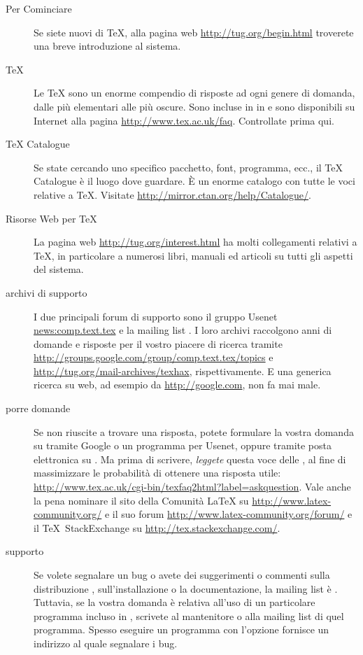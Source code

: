 \documentclass{article}
\begin{document}
\begin{description}
\item [Per Cominciare] Se siete nuovi di \TeX, alla pagina web
  \url{http://tug.org/begin.html} troverete una breve introduzione al sistema.

\item [\TeX{} ] Le \TeX{}  sono un enorme compendio di
  risposte ad ogni genere di domanda, dalle più elementari alle più
  oscure. Sono incluse in \TL{} in
   e sono disponibili
  su Internet alla pagina \url{http://www.tex.ac.uk/faq}. Controllate
  prima qui.

\item [\TeX{} Catalogue] Se state cercando uno specifico pacchetto, font,
  programma, ecc., il \TeX{} Catalogue è il luogo dove guardare. È un
  enorme catalogo con tutte le voci relative a \TeX. Visitate
  \url{http://mirror.ctan.org/help/Catalogue/}.


\item [Risorse Web per \TeX{}] La pagina web
  \url{http://tug.org/interest.html} ha molti collegamenti relativi a
  \TeX, in particolare a numerosi libri, manuali ed articoli su tutti
  gli aspetti del sistema.

\item [archivi di supporto] I due principali forum di supporto sono il
  gruppo Usenet \url{news:comp.text.tex} e la mailing list
  . I loro archivi raccolgono anni di domande e
  risposte per il vostro piacere di ricerca tramite
  \url{http://groups.google.com/group/comp.text.tex/topics} e
  \url{http://tug.org/mail-archives/texhax}, rispettivamente. E una
  generica ricerca su web, ad esempio da \url{http://google.com}, non fa
  mai male.

\item [porre domande] Se non riuscite a trovare una risposta, potete
  formulare la vostra domanda su  tramite Google o
  un programma per Usenet, oppure tramite posta elettronica su
  . Ma prima di scrivere, \emph{leggete} questa voce
  delle , al fine di massimizzare le probabilità di ottenere una
  risposta utile:
  \url{http://www.tex.ac.uk/cgi-bin/texfaq2html?label=askquestion}.
  Vale anche la pena nominare il sito della Comunità \LaTeX{} su
  \url{http://www.latex-community.org/} e il suo forum
  \url{http://www.latex-community.org/forum/} e il \TeX\ StackExchange su
  \url{http://tex.stackexchange.com/}.

\item [supporto \TL{}] Se volete segnalare un bug o avete dei suggerimenti o
  commenti sulla distribuzione \TL{}, sull'installazione o la
  documentazione, la mailing list è . Tuttavia, se
  la vostra domanda è relativa all'uso di un particolare programma incluso in
  \TL{}, scrivete al mantenitore o alla mailing list di quel programma.
  Spesso eseguire un programma con l'opzione  fornisce un
  indirizzo al quale segnalare i bug.

\end{description}
\end{document}
